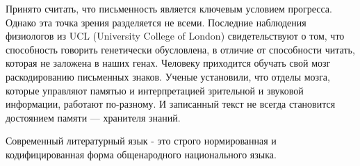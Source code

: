 Принято считать, что письменность является ключевым условием прогресса.
Однако эта точка зрения разделяется не всеми.
Последние наблюдения физиологов из UCL (University College of London) свидетельствуют о том, что способность говорить генетически обусловлена, в отличие от способности читать, которая не заложена в наших генах.
Человеку приходится обучать свой мозг раскодированию письменных знаков.
Ученые установили, что отделы мозга, которые управляют памятью и интерпретацией зрительной и звуковой информации, работают по-разному.
И записанный текст не всегда становится достоянием памяти --- хранителя знаний.
\begin{center}

\end{center}
Современный литературный язык - это строго нормированная и кодифицированная форма общенародного национального языка.
